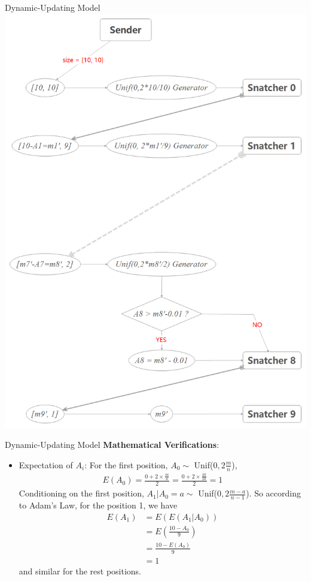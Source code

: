 \documentclass[12pt]{beamer}
\renewcommand{\[}{\begin{equation*} \begin{aligned}} %
\renewcommand{\]}{\end{aligned} \end{equation*}}
\begin{document}
\begin{frame}{Dynamic-Updating Model}
	\centering
	\includegraphics[scale=0.16]{model2.png}
\end{frame}

\begin{frame}{Dynamic-Updating Model}
	\textbf{Mathematical Verifications}:
	\begin{itemize}
		\item Expectation of $A_i$: For the first position, $A_0 \sim$ Unif($0, 2\frac{m}{n}$),
			\[
				E(A_0) = \frac{0 + 2 \times \frac{m}{n}}{2} = \frac{0 + 2 \times \frac{10}{10}}{2} = 1
			\]
			Conditioning on the first position, $A_1|A_0 = a \sim$ Unif($0, 2\frac{m-a}{n-1}$). So according to Adam's Law, for the position 1, we have
			\[
				E(A_1) &= E(E(A_1|A_0)) \\
					&= E(\frac{10 - A_0}{9}) \\
					&= \frac{10 - E(A_0)}{9} \\
					&= 1
			\]
			and similar for the rest positions.
	\end{itemize}
\end{frame}
\end{document}

